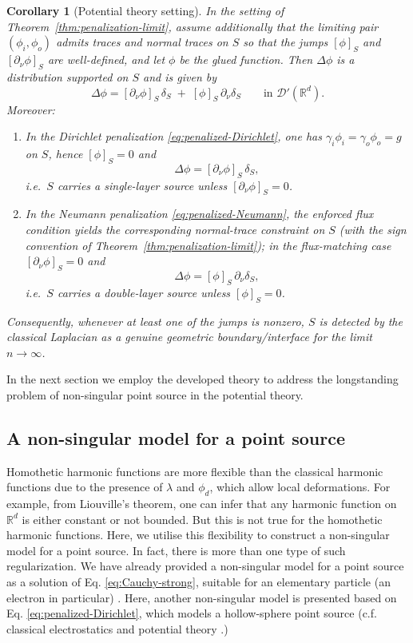 \documentclass[preprint,12pt]{elsarticle}
\theoremstyle{plain}
\newtheorem{corollary}[theorem]{Corollary}
\theoremstyle{definition}
\theoremstyle{note}
\newcommand{\R}{\mathbb{R}}
\begin{document}
\begin{corollary}[Potential theory setting] \label{cor:penalization-produces-layer}
In the setting of Theorem~\ref{thm:penalization-limit}, assume additionally that the limiting pair
$(\phi_i,\phi_o)$ admits traces and normal traces on $S$ so that the jumps $[\phi]_S$ and $[\partial_\nu\phi]_S$ are well-defined, and let $\phi$ be the glued function. Then $\Delta\phi$ is a distribution supported on $S$ and is given by
\[
\Delta\phi =[\partial_\nu\phi]_S\,\delta_S \;+\; [\phi]_S\,\partial_\nu\delta_S \qquad\text{in }\mathcal D'(\R^d).
\]
Moreover:
\begin{enumerate}
\item In the Dirichlet penalization \eqref{eq:penalized-Dirichlet}, one has $\gamma_i\phi_i=\gamma_o\phi_o=g$ on $S$, hence $[\phi]_S=0$ and
\[
\Delta\phi = [\partial_\nu\phi]_S\,\delta_S ,
\]
i.e.\ $S$ carries a \emph{single-layer} source unless $[\partial_\nu\phi]_S=0$.

\item In the Neumann penalization \eqref{eq:penalized-Neumann}, the enforced flux condition yields
the corresponding normal-trace constraint on $S$ (with the sign convention of
Theorem~\ref{thm:penalization-limit}); in the flux-matching case $[\partial_\nu\phi]_S=0$ and
\[
\Delta\phi = [\phi]_S\,\partial_\nu\delta_S ,
\]
i.e.\ $S$ carries a \emph{double-layer} source unless $[\phi]_S=0$.
\end{enumerate}
Consequently, whenever at least one of the jumps is nonzero, $S$ is detected by the classical
Laplacian as a genuine geometric boundary/interface for the limit $n\to\infty$.
\end{corollary}

In the next section we employ the developed theory to address the longstanding problem of non-singular point source in the potential theory.
\subsection{A non-singular model for a point source}\label{subsec:7.2}

Homothetic harmonic functions are more flexible than the classical harmonic functions due to the presence of $ \lambda $ and $ \phi _ d$, which allow local deformations. For example, from Liouville’s theorem, one can infer that any harmonic function on $\R^d$ is either constant or not bounded. But this is not true for the homothetic harmonic functions. Here, we utilise this flexibility to construct a non-singular model for a point source. In fact, there is more than one type of such regularization. We have already provided a non-singular model for a point source as a solution of Eq. \eqref{eq:Cauchy-strong}, suitable for an elementary particle (an electron in particular) \cite{Sabetghadam2025}. Here, another non-singular model is presented based on Eq. \eqref{eq:penalized-Dirichlet}, which models a hollow-sphere point source (c.f. classical electrostatics and potential theory \cite{Jackson1998,Kellogg1929}.) 
\end{document}
